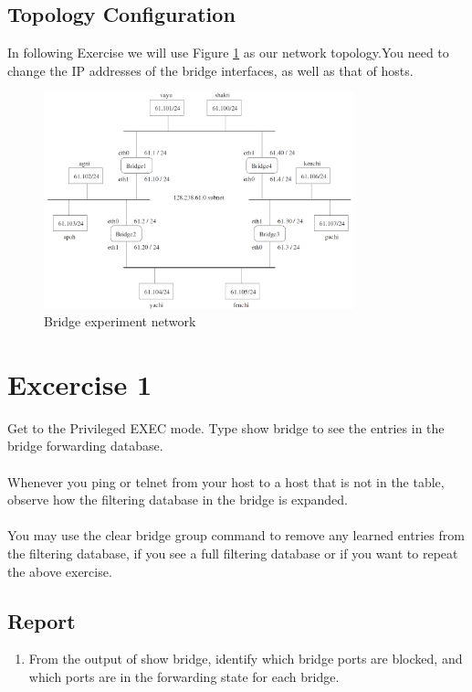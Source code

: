 \documentclass[10pt,a4paper]{article}
\numberwithin{equation}{section}
\numberwithin{figure}{section}
\numberwithin{table}{section}
\begin{document}
\subsection{Topology Configuration}
   In following Exercise we will use Figure \ref{fig:bridge-ex} as our network topology.You need to change the IP addresses of the bridge interfaces, as well as that of hosts.

\begin{figure}[H]
    \centering
    \includegraphics[width=0.8\textwidth]{img/fig4.png}
    \caption{Bridge experiment network}
    \label{fig:bridge-ex}
\end{figure}

\iffalse
\section{Excercise 1}
   Get to the Privileged EXEC mode. Type show bridge to see the entries in the bridge forwarding database. \\ 
\\
Whenever you ping or telnet from your host to a host that is not in the table, observe how the filtering database in the bridge is expanded. \\
\\
You may use the clear bridge group command to remove any learned entries from the filtering database, if you see a full filtering database or if you want to repeat the above exercise. 

   \subsection*{Report}
    \begin{enumerate}
        \item From the output of show bridge, identify which bridge ports are blocked, and which ports are in the forwarding state for each bridge.
    \end{enumerate}
\end{document}
